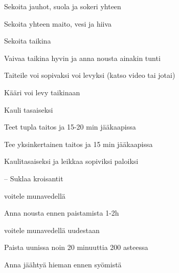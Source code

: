 
\begin{center}
    
\end{center}


\recipe{}
\item Sekoita jauhot, suola ja sokeri yhteen
\item Sekoita yhteen maito, vesi ja hiiva
\item Sekoita taikina
\item Vaivaa taikina hyvin ja anna nousta ainakin tunti
\item Taiteile voi sopivaksi voi levyksi (katso video tai jotai)
\item Kääri voi levy taikinaan
\item Kauli tasaiseksi
\item Teet tupla taitos ja 15-20 min jääkaapissa
\item Tee yksinkertainen taitos ja 15 min jääkaapissa
\item Kaulitasaiseksi ja leikkaa sopiviksi paloiksi

-- Suklaa kroisantit
\item voitele munavedellä
\item Anna nousta ennen paistamista 1-2h
\item voitele munavedellä uudestaan
\item Paista uunissa noin 20 minuuttia 200 asteessa
\item Anna jäähtyä hieman ennen syömistä